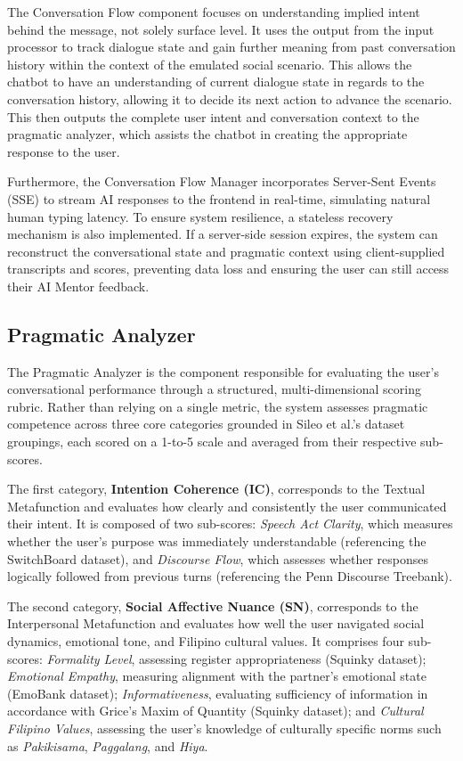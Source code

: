     The Conversation Flow component focuses on understanding implied intent behind the message, not solely surface level. It uses the output from the input processor to track dialogue state and gain further meaning from past conversation history within the context of the emulated social scenario. This allows the chatbot to have an understanding of current dialogue state in regards to the conversation history, allowing it to decide its next action to advance the scenario. This then outputs the complete user intent and conversation context to the pragmatic analyzer, which assists the chatbot in creating the appropriate response to the user.

    Furthermore, the Conversation Flow Manager incorporates Server-Sent Events (SSE) to stream AI responses to the frontend in real-time, simulating natural human typing latency. To ensure system resilience, a stateless recovery mechanism is also implemented. If a server-side session expires, the system can reconstruct the conversational state and pragmatic context using client-supplied transcripts and scores, preventing data loss and ensuring the user can still access their AI Mentor feedback.

    \subsection{Pragmatic Analyzer}

    The Pragmatic Analyzer is the component responsible for evaluating the user's 
    conversational performance through a structured, multi-dimensional scoring rubric. 
    Rather than relying on a single metric, the system assesses pragmatic competence 
    across three core categories grounded in Sileo et al.'s dataset groupings, each 
    scored on a 1-to-5 scale and averaged from their respective sub-scores.

    The first category, \textbf{Intention Coherence (IC)}, corresponds to the Textual 
    Metafunction and evaluates how clearly and consistently the user communicated their 
    intent. It is composed of two sub-scores: \textit{Speech Act Clarity}, which measures 
    whether the user's purpose was immediately understandable (referencing the SwitchBoard 
    dataset), and \textit{Discourse Flow}, which assesses whether responses logically 
    followed from previous turns (referencing the Penn Discourse Treebank).

    The second category, \textbf{Social Affective Nuance (SN)}, corresponds to the 
    Interpersonal Metafunction and evaluates how well the user navigated social dynamics, 
    emotional tone, and Filipino cultural values. It comprises four sub-scores: 
        \textit{Formality Level}, assessing register appropriateness (Squinky dataset); 
        \textit{Emotional Empathy}, measuring alignment with the partner's emotional state 
    (EmoBank dataset); \textit{Informativeness}, evaluating sufficiency of information 
    in accordance with Grice's Maxim of Quantity (Squinky dataset); and 
        \textit{Cultural Filipino Values}, assessing the user's knowledge of culturally 
    specific norms such as \textit{Pakikisama}, \textit{Paggalang}, and \textit{Hiya}.

